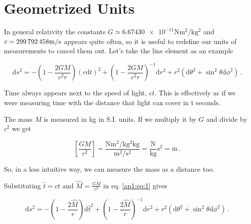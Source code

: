 
\chapter{Geometrized Units} \label{ap:geometrized_units}

In general relativity the constants $G \simeq \num{6.67430e-11}
\unit{\newton\meter\squared\per\kilo\gram\squared}$ and 
$c = \num{299792458} \unit[per-mode = symbol]{\meter\per\second}$ appears quite
often, so it is useful to redefine our units of measurements to cancel them out.
Let's take the \Sh line element as an example

\begin{equation}
    \mathrm{d}s^2 = - \left(1 - \frac{2 G M}{c^2 r} \right) (c \mathrm{d}t)^2
    + \left(1 - \frac{2 G M}{c^2 r} \right)^{-1} \mathrm{d}r^2
    + r^2 (\mathrm{d}\theta^2 + \sin^2 \theta \mathrm{d}\phi^2)
    \, .
    \label{ap1:eq:1}
\end{equation}

Time always appears next to the speed of light, $ct$. This is effectively as if
we were measuring time with the distance that light can cover in t seconds.
%

The mass $M$ is measured in \unit{\kilogram} in S.I. units.
If we multiply it by $G$ and divide by $c^2$ we get 

\begin{equation*}
    \left[\frac{GM}{c^2} \right] =
    \frac{\unit{\newton\meter\squared\per\kilo\gram\squared\kilo\gram}}
    {\unit{\meter\squared\per\second\squared}} = 
    \frac{\unit{\newton}}{\unit{\kilogram}} \unit{\second\squared}=
    \unit{\meter} \, .
\end{equation*}

So, in a less intuitive way, we can measure the mass as a distance too.

Substituting $\hat t = ct$ and $\hat M = \frac{GM}{c^2}$ in eq. \ref{ap1:eq:1}
gives


\begin{equation*}
    \mathrm{d}s^2 = - \left(1 - \frac{2 \hat M}{r} \right) \mathrm{d} \hat t^2
    + \left(1 - \frac{2 \hat M}{r} \right)^{-1} \mathrm{d}r^2
    + r^2 (\mathrm{d}\theta^2 + \sin^2 \theta \mathrm{d}\phi^2)
    \, .
\end{equation*}

